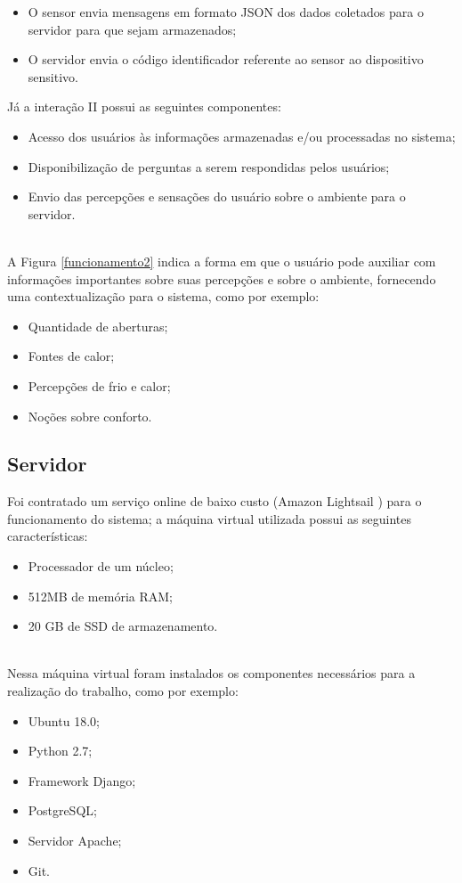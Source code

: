 \begin{itemize}
  \item O sensor envia mensagens em formato JSON dos dados coletados para o servidor para que sejam armazenados;
  \item O servidor envia o código identificador referente ao sensor ao dispositivo sensitivo.
\end{itemize}

\null Já a interação II possui as seguintes componentes:
\begin{itemize}
  \item Acesso dos usuários às informações armazenadas e/ou processadas no sistema;
  \item Disponibilização de perguntas a serem respondidas pelos usuários;
  \item Envio das percepções e sensações do usuário sobre o ambiente para o servidor.
\end{itemize}


\\\null \quad A Figura \ref{funcionamento2} indica a forma em que o usuário pode auxiliar com informações importantes sobre suas percepções e sobre o ambiente, fornecendo uma contextualização para o sistema, como por exemplo:
\begin{itemize}
  \item Quantidade de aberturas;
  \item Fontes de calor;
  \item Percepções de frio e calor;
  \item Noções sobre conforto.
\end{itemize}


\subsection{Servidor}
\nul \quad Foi contratado um serviço online de baixo custo (Amazon Lightsail \cite{lightsail}) para o funcionamento do sistema; a máquina virtual utilizada possui as seguintes características:
\begin{itemize}
  \item Processador de um núcleo;
  \item 512MB de memória RAM;
  \item 20 GB de SSD de armazenamento.
\end{itemize}
\\\null \quad Nessa máquina virtual foram instalados os componentes necessários para a realização do trabalho, como por exemplo:
\begin{itemize}
  \item Ubuntu 18.0;
  \item Python 2.7;
  \item Framework Django;
  \item PostgreSQL;
  \item Servidor Apache;
  \item Git.
\end{itemize}

